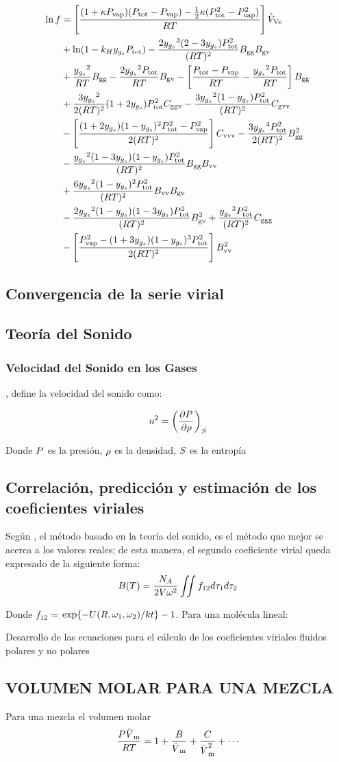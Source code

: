 \figVirialBCBehavior

\begin{align}
  \eqVirialFactorCorrection{}
\end{align}

\factorCorrectionNaming{}

\subsection{Convergencia de la serie virial}

\subsection{Teoría del Sonido}
\subsubsection*{Velocidad del Sonido en los Gases}

\parencite[p. 186]{Wilhelm2010}, define la velocidad del sonido como:

\begin{align}
  \label{cap:subsec:velocidadSonido}
  {\ensuremath{u}}^2 = \left(\frac{\partial P_{}^{}}{\partial \rho}\right)_{S}
\end{align}

Donde $P_{}^{}{}{}$  es la presión, $\rho$ es la densidad, $S$ es la entropía

\subsection{Correlación, predicción y estimación de los coeficientes viriales}
\label{cap2:subsec:tagEqnPredict}




Según \parencite[ p. 12]{Dymond2002}, el método basado en la teoría del sonido, es el método que mejor se acerca a los valores reales; de esta manera, el segundo coeficiente virial queda expresado de la siguiente forma:
\begin{equation}
  {\ensuremath{B_{}}}(T) = \frac{N_A}{2 {V} \omega^2} \iint {f_{12}} d{\tau_1 d{\tau_2}}
\end{equation}


Donde $f_{12}$ = $ \ce{exp}{\{-U(R, \omega_1 , \omega_2)/kt\}} - 1 $. Para una molécula lineal:

Desarrollo de las ecuaciones para el cálculo de los coeficientes viriales fluidos polares y no polares





\subsection{VOLUMEN MOLAR PARA UNA MEZCLA}
    Para una mezcla el volumen molar
  \begin{equation}
    \eqVirialForVDevelopForMixture
  \end{equation}
    
    \eqVirialForVDevelopMixtureNaming